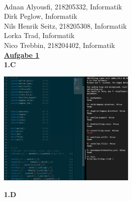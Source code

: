 \documentclass[a4paper, dvipsnames]{article}
\begin{document}
{   {\hspace{6,0cm}{Gruppe 10}}\\

Adnan Alyousfi, 218205332, Informatik\\
Dirk Peglow, Informatik\\
Nils Henrik Seitz, 218205308, Informatik\\
Lorka Trad, Informatik\\
Nico Trebbin, 218204402, Informatik\\

\uline{\bfseries{Aufgabe 1}}\\
{\bfseries 1.C}\\
\begin{center}
\includegraphics[width=0.5\textwidth]{Data/A1/C.png}
\end{center}


{\bfseries 1.D}\\

}
\end{document}
